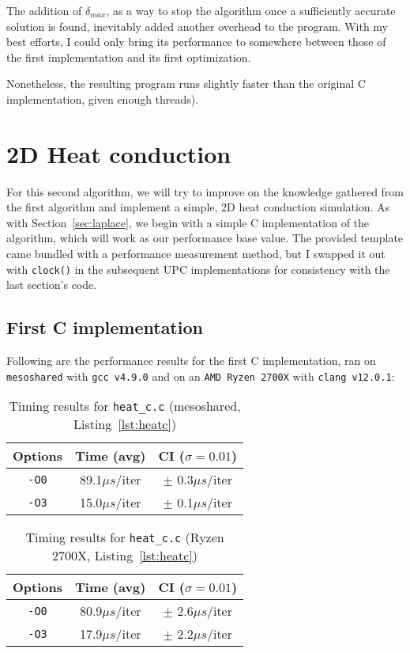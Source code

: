 \documentclass[12pt]{article}
\newcommand{\us}[0]{${\mu}s$}
\begin{document}
The addition of $\delta_{max}$, as a way to stop the algorithm once a sufficiently accurate solution is found, inevitably added another overhead to the program.
With my best efforts, I could only bring its performance to somewhere between those of the first implementation and its first optimization.

Nonetheless, the resulting program runs slightly faster than the original C implementation, given enough threads).

\section{2D Heat conduction}
\label{sec:heat}

For this second algorithm, we will try to improve on the knowledge gathered from the first algorithm and implement a simple, 2D heat conduction simulation.
As with Section~\ref{sec:laplace}, we begin with a simple C implementation of the algorithm, which will work as our performance base value.
The provided template came bundled with a performance measurement method, but I swapped it out with \texttt{clock()} in the subsequent UPC implementations for consistency with the last section's code.

\subsection{First C implementation}

Following are the performance results for the first C implementation, ran on \texttt{mesoshared} with \texttt{gcc v4.9.0} and on an \texttt{AMD Ryzen 2700X} with \texttt{clang v12.0.1}:

\begin{table}[h]
  \centering\begin{tabular}{|c|c|c|}
    \hline
    Options & Time (avg) & CI ($\sigma=0.01$) \\
    \hline
    \texttt{-O0} & 89.1\us/iter & $\pm$ 0.3\us/iter \\
    \texttt{-O3} & 15.0\us/iter & $\pm$ 0.1\us/iter \\
    \hline
  \end{tabular}
  \caption{Timing results for \texttt{heat\_c.c} (mesoshared, Listing~\ref{lst:heatc})}
  \label{tab:heatc}
\end{table}

\begin{table}[h]
  \centering\begin{tabular}{|c|c|c|}
    \hline
    Options & Time (avg) & CI ($\sigma=0.01$) \\
    \hline
    \texttt{-O0} & 80.9\us/iter & $\pm$ 2.6\us/iter \\
    \texttt{-O3} & 17.9\us/iter & $\pm$ 2.2\us/iter \\
    \hline
  \end{tabular}
  \caption{Timing results for \texttt{heat\_c.c} (Ryzen 2700X, Listing~\ref{lst:heatc})}
  \label{tab:heatcr}
\end{table}
\end{document}
